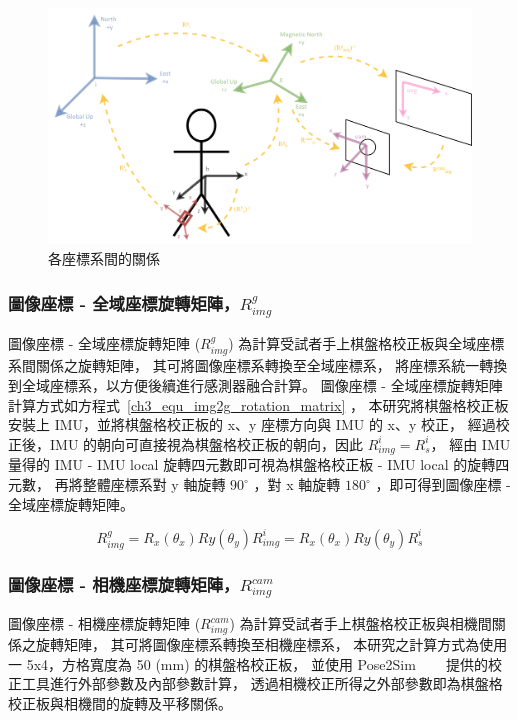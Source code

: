 \begin{figure}[!ht]
   \centering
   \includegraphics[width=\textwidth]{figure/ch3_fig_coordinate_trans.png}
    \caption[各座標系間的關係]{各座標系間的關係}
    \label{ch3_fig_coordinate_trans}
\end{figure}

\subsubsection{圖像座標 - 全域座標旋轉矩陣，$R^{g}_{img}$}
圖像座標 - 全域座標旋轉矩陣 ($R^{g}_{img}$) 為計算受試者手上棋盤格校正板與全域座標系間關係之旋轉矩陣，
其可將圖像座標系轉換至全域座標系，
將座標系統一轉換到全域座標系，以方便後續進行感測器融合計算。
圖像座標 - 全域座標旋轉矩陣計算方式如方程式~\ref{ch3_equ_img2g_rotation_matrix} ，
本研究將棋盤格校正板安裝上 IMU，並將棋盤格校正板的 x、y 座標方向與 IMU 的 x、y 校正，
經過校正後，IMU 的朝向可直接視為棋盤格校正板的朝向，因此 $R^{i}_{img} = R^{i}_{s}$，
經由 IMU 量得的 IMU - IMU local 旋轉四元數即可視為棋盤格校正板 - IMU local 的旋轉四元數，
再將整體座標系對 y 軸旋轉 $90^{\circ}$ ，對 x 軸旋轉 $180^{\circ}$ ，即可得到圖像座標 - 全域座標旋轉矩陣。

\begin{equation}
   R^{g}_{img} = R_{x}(\theta_{x})R{y}(\theta_{y})R^{i}_{img} = R_{x}(\theta_{x})R{y}(\theta_{y})R^{i}_{s}
   \label{ch3_equ_img2g_rotation_matrix}
\end{equation}

\subsubsection{圖像座標 - 相機座標旋轉矩陣，$R^{cam}_{img}$}
圖像座標 - 相機座標旋轉矩陣 ($R^{cam}_{img}$) 為計算受試者手上棋盤格校正板與相機間關係之旋轉矩陣，
其可將圖像座標系轉換至相機座標系，
本研究之計算方式為使用一 5x4，方格寬度為 50 (mm) 的棋盤格校正板，
並使用 Pose2Sim ~\cite{Pagnon_2022_JOSS}~\cite{Pagnon_2021_Robustness}~\cite{Pagnon_2022_Accuracy} 提供的校正工具進行外部參數及內部參數計算，
透過相機校正所得之外部參數即為棋盤格校正板與相機間的旋轉及平移關係。

